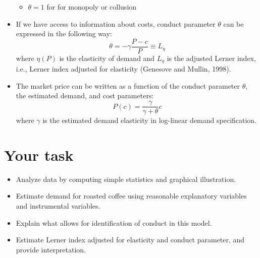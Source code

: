\documentclass[11pt]{article}
\begin{document}
\begin{itemize}
\begin{itemize}
\item $\theta=1$ for for monopoly or collusion
\end{itemize}
\item If we have access to information
about costs, conduct parameter $\theta$ can be expressed in the following way:
\begin{equation}
\theta=-\gamma\frac{P-c}{P}\equiv L_{\eta}
\end{equation}
where $\eta (P)$ is the elasticity of demand and $L_{\eta}$ is the adjusted Lerner index,
i.e., Lerner index adjusted for elasticity (Genesove and Mullin, 1998).
\item The market price can be written as a function of the conduct parameter $\theta$, the
estimated demand, and cost parameters:
\begin{equation}
P(c)=\frac{\gamma}{\gamma+\theta}c
\end{equation}
where $\gamma$ is the estimated demand elasticity in log-linear demand specification.
\end{itemize}

\section*{Your task}
\begin{itemize}
\item Analyze data by computing simple statistics and graphical illustration.
\item Estimate demand for roasted coffee using reasonable explanatory variables and instrumental variables.
\item Explain what allows for identification of conduct in this model.
\item Estimate Lerner index adjusted for elasticity and conduct parameter, and provide interpretation.
\end{itemize}
\end{document}
